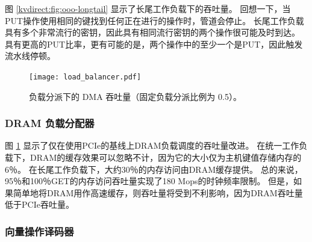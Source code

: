 图 \ref {kvdirect:fig:ooo-longtail} 显示了长尾工作负载下的吞吐量。
回想一下，当PUT操作使用相同的键找到任何正在进行的操作时，管道会停止。
长尾工作负载具有多个非常流行的密钥，因此具有相同流行密钥的两个操作很可能及时到达。
具有更高的PUT比率，更有可能的是，两个操作中的至少一个是PUT，因此触发流水线停顿。


\begin{figure}[t]
\centering
{\texttt{[image: load\_balancer.pdf]}}
\caption{负载分派下的 DMA 吞吐量（固定负载分派比例为 0.5）。}
\label{kvdirect:fig:cache-tput}

\end{figure}

\subsubsection{DRAM 负载分配器}
\label{kvdirect:sec:dram-eval}

图 \ref {kvdirect:fig:cache-tput} 显示了仅在使用PCIe的基线上DRAM负载调度的吞吐量改进。
在统一工作负载下，DRAM的缓存效果可以忽略不计，因为它的大小仅为主机键值存储内存的6％。
在长尾工作负载下，大约30％的内存访问由DRAM缓存提供。 总的来说，95％和100％GET的内存访问吞吐量实现了180 Mops的时钟频率限制。
但是，如果简单地将DRAM用作高速缓存，则吞吐量将受到不利影响，因为DRAM吞吐量低于PCIe吞吐量。

\subsubsection{向量操作译码器}
\label{kvdirect:network-eval}

\begin{table}[]
\centering
{}
\caption{向量操作的吞吐量 (GB/s)。}
\label{kvdirect:tab:vec_throughput}

\end{table}

